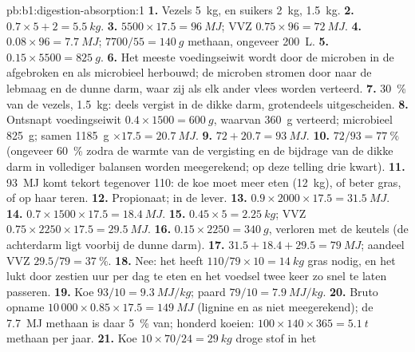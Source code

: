 \begin{solution}{pb:b1:digestion-absorption:1}
\textbf{1.} Vezels \qty{5}{kg},  en suikers \qty{2}{kg}, 
\qty{1.5}{kg}.
\textbf{2.} $0.7\times 5 + 2 = \qty{5.5}{kg}$.
\textbf{3.} $5500\times 17.5 = \qty{96}{MJ}$; VVZ $0.75\times 96 =
\qty{72}{MJ}$.
\textbf{4.} $0.08\times 96 = \qty{7.7}{MJ}$; $7700/55 = \qty{140}{g}$
methaan, ongeveer \qty{200}{L}.
\textbf{5.} $0.15\times 5500 = \qty{825}{g}$.
\textbf{6.} Het meeste voedingseiwit wordt door de microben in de 
afgebroken en als microbieel  herbouwd; de microben stromen door naar
de lebmaag en de dunne darm, waar zij als elk ander vlees worden verteerd.
\textbf{7.} \qty{30}{\%} van de vezels, \qty{1.5}{kg}: deels vergist in de
dikke darm, grotendeels uitgescheiden.
\textbf{8.} Ontsnapt voedingseiwit $0.4\times 1500 = \qty{600}{g}$, waarvan
\qty{360}{g} verteerd; microbieel \qty{825}{g}; samen \qty{1185}{g}
$\times 17.5 = \qty{20.7}{MJ}$.
\textbf{9.} $72 + 20.7 = \qty{93}{MJ}$.
\textbf{10.} $72/93 = \qty{77}{\%}$ (ongeveer \qty{60}{\%} zodra de warmte
van de vergisting en de bijdrage van de dikke darm in vollediger balansen
worden meegerekend; op deze telling drie kwart).
\textbf{11.} \qty{93}{MJ} komt tekort tegenover \qty{110}{}: de koe moet
meer eten (\qty{12}{kg}), of beter gras, of op haar  teren.
\textbf{12.} Propionaat;  in de lever.
\textbf{13.} $0.9\times 2000\times 17.5 = \qty{31.5}{MJ}$.
\textbf{14.} $0.7\times 1500\times 17.5 = \qty{18.4}{MJ}$.
\textbf{15.} $0.45\times 5 = \qty{2.25}{kg}$; VVZ $0.75\times 2250\times
17.5 = \qty{29.5}{MJ}$.
\textbf{16.} $0.15\times 2250 = \qty{340}{g}$, verloren met de keutels (de
achterdarm ligt voorbij de dunne darm).
\textbf{17.} $31.5 + 18.4 + 29.5 = \qty{79}{MJ}$; aandeel VVZ $29.5/79 =
\qty{37}{\%}$.
\textbf{18.} Nee: het heeft $110/79\times 10 = \qty{14}{kg}$ gras nodig, en
het lukt door zestien uur per dag te eten en het voedsel twee keer zo snel
te laten passeren.
\textbf{19.} Koe $93/10 = \qty{9.3}{MJ/kg}$; paard $79/10 =
\qty{7.9}{MJ/kg}$.
\textbf{20.} Bruto opname $10\,000\times 0.85\times 17.5 =
\qty{149}{MJ}$ (lignine en as niet meegerekend); de \qty{7.7}{MJ} methaan
is daar \qty{5}{\%} van; honderd koeien: $100\times 140\times 365 =
\qty{5.1}{t}$ methaan per jaar.
\textbf{21.} Koe $10\times 70/24 = \qty{29}{kg}$ droge stof in het 

\end{solution}
